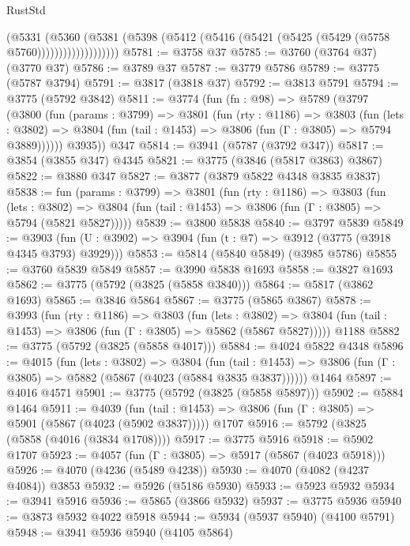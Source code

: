 \begin{lexlean}{RustStd}
\begin{coremodule}
                      (@5331
                        (@5360
                          (@5381
                            (@5398
                              (@5412 (@5416 (@5421 (@5425 (@5429 (@5758 @5760)))))))))))))))))))
@5781 := @3758 @37
@5785 := @3760 (@3764 @37) (@3770 @37)
@5786 := @3789 @37
@5787 := @3779 @5786
@5789 := @3775 (@5787 @3794)
@5791 := @3817 (@3818 @37)
@5792 := @3813 @5791
@5794 := @3775 (@5792 @3842)
@5811 := @3774
    (fun (fn : @98) =>
    @5789
      (@3797
        (@3800
          (fun (params : @3799) =>
          @3801
            (fun (rty : @1186) =>
            @3803
              (fun (lets : @3802) =>
              @3804 (fun (tail : @1453) => @3806 (fun (Γ : @3805) => @5794 @3889))))))
        @3935))
    @347
@5814 := @3941 (@5787 (@3792 @347))
@5817 := @3854 (@3855 @347) @4345
@5821 := @3775 (@3846 (@5817 @3863) @3867)
@5822 := @3880 @347
@5827 := @3877 (@3879 @5822 @4348 @3835 @3837)
@5838 := fun (params : @3799) =>
  @3801
    (fun (rty : @1186) =>
    @3803
      (fun (lets : @3802) =>
      @3804 (fun (tail : @1453) => @3806 (fun (Γ : @3805) => @5794 (@5821 @5827)))))
@5839 := @3800 @5838
@5840 := @3797 @5839
@5849 := @3903 (fun (U : @3902) => @3904 (fun (t : @7) => @3912 (@3775 (@3918 @4345 @3793) @3929)))
@5853 := @5814 (@5840 @5849) (@3985 @5786)
@5855 := @3760 @5839 @5849
@5857 := @3990 @5838 @1693
@5858 := @3827 @1693
@5862 := @3775 (@5792 (@3825 (@5858 @3840)))
@5864 := @5817 (@3862 @1693)
@5865 := @3846 @5864
@5867 := @3775 (@5865 @3867)
@5878 := @3993
    (fun (rty : @1186) =>
    @3803
      (fun (lets : @3802) =>
      @3804 (fun (tail : @1453) => @3806 (fun (Γ : @3805) => @5862 (@5867 @5827)))))
    @1188
@5882 := @3775 (@5792 (@3825 (@5858 @4017)))
@5884 := @4024 @5822 @4348
@5896 := @4015
    (fun (lets : @3802) =>
    @3804
      (fun (tail : @1453) => @3806 (fun (Γ : @3805) => @5882 (@5867 (@4023 (@5884 @3835 @3837))))))
    @1464
@5897 := @4016 @4571
@5901 := @3775 (@5792 (@3825 (@5858 @5897)))
@5902 := @5884 @1464
@5911 := @4039
    (fun (tail : @1453) => @3806 (fun (Γ : @3805) => @5901 (@5867 (@4023 (@5902 @3837)))))
    @1707
@5916 := @5792 (@3825 (@5858 (@4016 (@3834 @1708))))
@5917 := @3775 @5916
@5918 := @5902 @1707
@5923 := @4057 (fun (Γ : @3805) => @5917 (@5867 (@4023 @5918)))
@5926 := @4070 (@4236 (@5489 @4238))
@5930 := @4070 (@4082 (@4237 @4084)) @3853
@5932 := @5926 (@5186 @5930)
@5933 := @5923 @5932
@5934 := @3941 @5916
@5936 := @5865 (@3866 @5932)
@5937 := @3775 @5936
@5940 := @3873 @5932 @4022 @5918
@5944 := @5934 (@5937 @5940) (@4100 @5791)
@5948 := @3941 @5936 @5940 (@4105 @5864)

\end{coremodule}
\end{lexlean}
